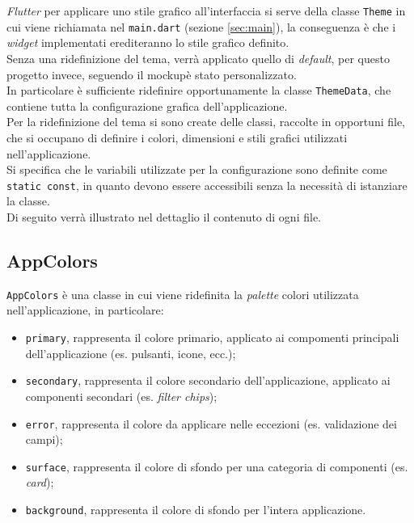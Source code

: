 \emph{Flutter}\cite{site:flutter} per applicare uno stile grafico all'interfaccia si serve della classe \lstinline{Theme}\cite{site:theme-class} in cui viene richiamata nel \lstinline{main.dart} (sezione \ref{sec:main}), la conseguenza è che i \emph{widget} implementati erediteranno lo stile grafico definito. \\
Senza una ridefinizione del tema, verrà applicato quello di \emph{default}, per questo progetto invece, seguendo il \gls{mockup}\glsoccur è stato personalizzato. \\
In particolare è sufficiente ridefinire opportunamente la classe \lstinline{ThemeData}\cite{site:theme-data-class}, che contiene tutta la configurazione grafica dell'applicazione. \\
Per la ridefinizione del tema si sono create delle classi, raccolte in opportuni file, che si occupano di definire i colori, dimensioni e stili grafici utilizzati nell'applicazione. \\
Si specifica che le variabili utilizzate per la configurazione sono definite come \lstinline{static const}, in quanto devono essere accessibili senza la necessità di istanziare la classe. \\
Di seguito verrà illustrato nel dettaglio il contenuto di ogni file.

\subsection{AppColors}
\label{subsec:app-colors}

\lstinline{AppColors} è una classe in cui viene ridefinita la \emph{palette} colori utilizzata nell'applicazione, in particolare:
\begin{itemize}
    \item \lstinline{primary}, rappresenta il colore primario, applicato ai compomenti principali dell'applicazione (es. pulsanti, icone, ecc.);
    \item \lstinline{secondary}, rappresenta il colore secondario dell'applicazione, applicato ai componenti secondari (es. \emph{filter chips}\cite{site:chips});
    \item \lstinline{error}, rappresenta il colore da applicare nelle eccezioni (es. validazione dei campi);
    \item \lstinline{surface}, rappresenta il colore di sfondo per una categoria di componenti (es. \emph{card}\cite{site:card});
    \item \lstinline{background}, rappresenta il colore di sfondo per l'intera applicazione.
\end{itemize}

